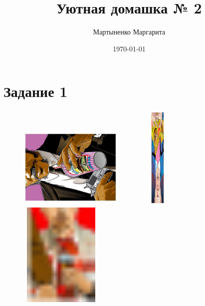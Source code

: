 \documentclass[12pt, a4paper]{article}
\author{Мартыненко Маргарита}
\title{Уютная домашка № 2}
\date{\today}
\begin{document}
\maketitle
\newpage


\section{Задание 1} 


 \begin{figure}[h!]
\begin{minipage}[H]{0.3\linewidth} 
\center \includegraphics[height=4cm,width=5cm,angle = 270]{pop1.pdf}
\end{minipage}
\begin{minipage}[H]{0.3\linewidth} 
\center  \includegraphics[height=5cm,width=4cm,angle = 180]{pop2.pdf}
\end{minipage}
\begin{minipage}[H]{0.3\linewidth} 
\center  \includegraphics[height=5cm,width=4cm]{pop3.pdf}
\end{minipage}
\vfil
\begin{minipage}[H]{0.3\linewidth} 

\end{minipage}
\end{figure}
\end{document}
